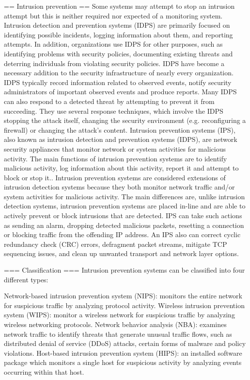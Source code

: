 == Intrusion prevention ==
Some systems may attempt to stop an intrusion attempt but this is neither required nor expected of a monitoring system. Intrusion detection and prevention systems (IDPS) are primarily focused on identifying possible incidents, logging information about them, and reporting attempts.  In addition, organizations use IDPS for other purposes, such as identifying problems with security policies, documenting existing threats and deterring individuals from violating security policies. IDPS have become a necessary addition to the security infrastructure of nearly every organization.
IDPS typically record information related to observed events, notify security administrators of important observed events and produce reports. Many IDPS can also respond to a detected threat by attempting to prevent it from succeeding. They use several response techniques, which involve the IDPS stopping the attack itself, changing the security environment (e.g. reconfiguring a firewall) or changing the attack's content.
Intrusion prevention systems (IPS), also known as intrusion detection and prevention systems (IDPS), are network security appliances that monitor network or system activities for malicious activity. The main functions of intrusion prevention systems are to identify malicious activity, log information about this activity, report it and attempt to block or stop it..
Intrusion prevention systems are considered extensions of intrusion detection systems because they both monitor network traffic and/or system activities for malicious activity. The main differences are, unlike intrusion detection systems, intrusion prevention systems are placed in-line and are able to actively prevent or block intrusions that are detected. IPS can take such actions as sending an alarm, dropping detected malicious packets, resetting a connection or blocking traffic from the offending IP address. An IPS also can correct cyclic redundancy check (CRC) errors, defragment packet streams, mitigate TCP sequencing issues, and clean up unwanted transport and network layer options.


=== Classification ===
Intrusion prevention systems can be classified into four different types:

Network-based intrusion prevention system (NIPS):  monitors the entire network for suspicious traffic by analyzing protocol activity.
Wireless intrusion prevention system (WIPS): monitor a wireless network for suspicious traffic by analyzing wireless networking protocols.
Network behavior analysis (NBA): examines network traffic to identify threats that generate unusual traffic flows, such as distributed denial of service (DDoS) attacks, certain forms of malware and policy violations.
Host-based intrusion prevention system (HIPS): an installed software package which monitors a single host for suspicious activity by analyzing events occurring within that host.


